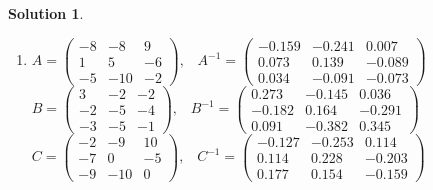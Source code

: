 \documentclass[11pt]{article}
\theoremstyle{definition}
\theoremstyle{nopunct}
\newtheorem*{s}{Solution}
\begin{document}
\begin{s}
\begin{enumerate}
        \item
            $A = 
            \begin{pmatrix}
                -8 & -8 & 9 \\
                1 & 5 & -6 \\
                -5 & -10 & -2
            \end{pmatrix},\;\;\; A^{-1} =
            \begin{pmatrix}
                -0.159 & -0.241 & 0.007 \\
                0.073 & 0.139 & -0.089 \\
                0.034 & -0.091 & -0.073
            \end{pmatrix}$
            \bigskip \\
            $B = 
            \begin{pmatrix}
                3 & -2 & -2 \\
                -2 & -5 & -4 \\
                -3 & -5 & -1
            \end{pmatrix},\;\;\; B^{-1} =
            \begin{pmatrix}
                0.273 & -0.145 & 0.036 \\
                -0.182 & 0.164 & -0.291 \\
                0.091 & -0.382 & 0.345
            \end{pmatrix}$
            \bigskip \\
            $C = 
            \begin{pmatrix}
                -2 & -9 & 10 \\
                -7 & 0 & -5 \\
                -9 & -10 & 0
            \end{pmatrix},\;\;\; C^{-1} =
            \begin{pmatrix}
                -0.127 & -0.253 & 0.114 \\
                0.114 & 0.228 & -0.203 \\
                0.177 & 0.154 & -0.159
            \end{pmatrix}$
    \end{enumerate}
\end{s}
\end{document}
